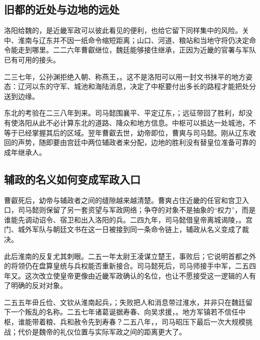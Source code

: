 \subsection{旧都的近处与边地的远处}

洛阳给魏的，是近畿军政可以彼此看见的便利，也给它留下同样集中的风险。关中、淮南与辽东并不因一纸命令缩短距离；山口、河道、粮站和当地守将仍决定命令能走到哪里。二二六年曹叡继位，魏廷能够接住继承，正因为近畿的官署与军队已有可用的接头。

二三七年，公孙渊拒绝入朝、称燕王，。这不是洛阳可以用一封文书抹平的地方姿态：辽河以东的守军、城池和海陆消息，决定了中枢要付出多长的路程才能把处分送到边缘。

东北的考验在二三八年到来。司马懿围襄平、平定辽东，；远征带回了胜利，却没有使洛阳从此不必计算东北的道路、降众和地方信息。中枢可以抵达一处城池，不等于已经掌握其后的区域。翌年曹叡去世，幼帝即位，曹爽与司马懿。刚从辽东收回的声势，随即要由宫廷中两位辅政者来分配，边地的胜利没有替皇位准备可靠的成年继承人。

\subsection{辅政的名义如何变成军政入口}

曹叡死后，幼帝与辅政者之间的缝隙越来越清楚。曹爽占住近畿的任官和宫卫入口，司马懿则保留了另一套资望与军政网络；争夺的对象不是抽象的“权力”，而是谁能先调动诏令、宿卫和出入洛阳的兵。二四九年，司马懿借皇帝离城谒陵，。宫门、城外军队与朝廷文书在这一日被接到同一条命令链上，辅政从名义变成了裁决。

此后淮南的反复尤其刺眼。二五一年太尉王凌谋立楚王，事败后；它说明首都之外的将领仍在盘算皇统与兵权能否重新接合。司马懿死后，司马师接手中军，二五四年又。这次改立使皇帝更像由近畿军政确认的名位，也让不愿接受这一逻辑的人有了明确的反对对象。

二五五年毌丘俭、文钦从淮南起兵，；失败把人和消息带过淮水，并非只在魏廷留下一个叛乱的名称。二五七年诸葛诞据寿春、向吴求援，。地方军镇若不信任中枢，谁能带着粮、兵和赦令先到寿春？二五八年，，司马昭压下最后一次大规模挑战；代价是魏帝的礼仪位置与实际军政之间的距离更大了。

